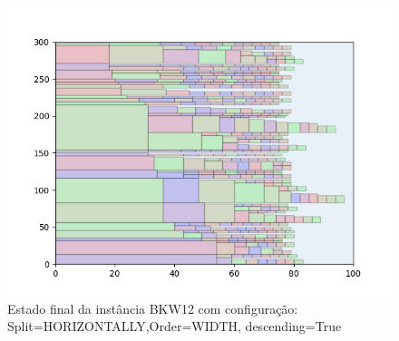 \begin{figure}[H]
    \centering
    \caption[]{Estado final da instância BKW12 com configuração: Split=HORIZONTALLY,Order=WIDTH, descending=True}
    \label{fig:bkw12-horizontally-width-true}
    \includegraphics[scale=0.5]{output/figures/bkw/bkw12/horizontally/width/true/000}
\end{figure}